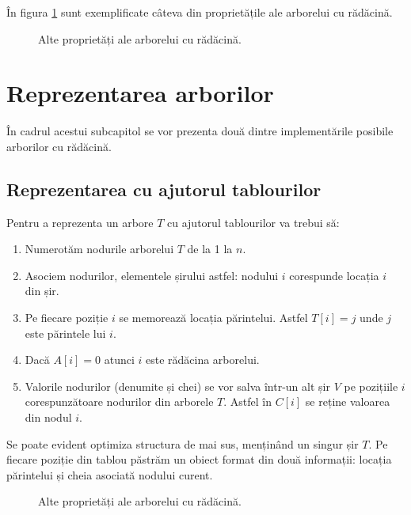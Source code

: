 În figura \ref{fig:proprietatiarbore} sunt exemplificate câteva din proprietățile ale arborelui cu rădăcină.


\begin{figure}[H] 
	\centering	
	{
	}
	\caption{Alte proprietăți ale arborelui cu rădăcină.} 
	\label{fig:proprietatiarbore}
\end{figure}


\section{Reprezentarea arborilor}

În cadrul acestui subcapitol se vor prezenta două dintre implementările posibile arborilor cu rădăcină.

\subsection{Reprezentarea cu ajutorul tablourilor}

Pentru a reprezenta un arbore $T$ cu ajutorul tablourilor va trebui să:

\begin{enumerate}
	\item Numerotăm nodurile arborelui $T$ de la 1 la $n$.
	\item Asociem nodurilor, elementele șirului astfel: nodului $i$ corespunde locația $i$ din șir.
	\item Pe fiecare poziție $i$ se memorează locația părintelui. Astfel $T[i]=j$ unde $j$ este părintele lui $i$.
	\item Dacă $A[i]=0$ atunci $i$ este rădăcina arborelui.
	\item Valorile nodurilor (denumite și chei) se vor salva într-un alt șir $V$ pe pozițiile $i$ corespunzătoare nodurilor din arborele $T$. Astfel în $C[i]$ se reține valoarea din nodul $i$.
\end{enumerate}

Se poate evident optimiza structura de mai sus, menținând un singur șir $T$. Pe fiecare poziție din tablou păstrăm un obiect format din două informații: locația părintelui și cheia asociată nodului curent.

\begin{figure}[H] 
	\centering	
	{
	}
	\caption{Alte proprietăți ale arborelui cu rădăcină.} 
	\label{fig:reprezentaresiruri}
\end{figure}


